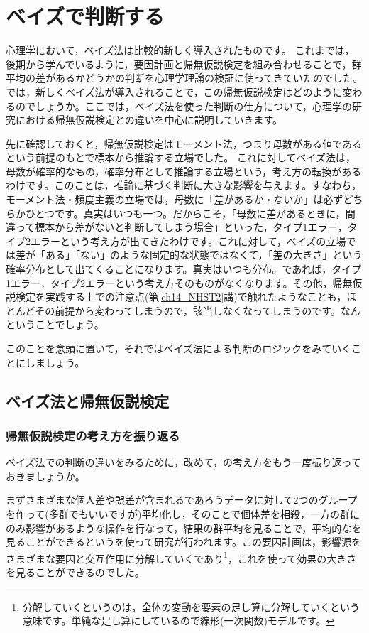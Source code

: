\documentclass{ltjbook}
\begin{document}
\VerbatimFootnotes

\chapter{ベイズで判断する}
\label{ch27_bayes_judgement}

心理学において，ベイズ法は比較的新しく導入されたものです。
これまでは，後期から学んでいるように，要因計画と帰無仮説検定を組み合わせることで，群平均の差があるかどうかの判断を心理学理論の検証に使ってきていたのでした。では，新しくベイズ法が導入されることで，この帰無仮説検定はどのように変わるのでしょうか。ここでは，ベイズ法を使った判断の仕方について，心理学の研究における帰無仮説検定との違いを中心に説明していきます。

先に確認しておくと，帰無仮説検定はモーメント法，つまり母数がある値であるという前提のもとで標本から推論する立場でした。
これに対してベイズ法は，母数が確率的なもの，確率分布として推論する立場という，考え方の転換があるわけです。このことは，推論に基づく判断に大きな影響を与えます。すなわち，モーメント法・頻度主義の立場では，母数に「差があるか・ないか」は必ずどちらかひとつです。真実はいつも一つ。だからこそ，「母数に差があるときに，間違って標本から差がないと判断してしまう場合」といった，タイプ1エラー，タイプ2エラーという考え方が出てきたわけです。これに対して，ベイズの立場では差が「ある」「ない」のような固定的な状態ではなくて，「差の大きさ」という確率分布として出てくることになります。真実はいつも分布。であれば，タイプ1エラー，タイプ2エラーという考え方そのものがなくなります。その他，帰無仮説検定を実践する上での注意点(第\ref{ch14_NHST2}講)で触れたようなことも，ほとんどその前提から変わってしまうので，該当しなくなってしまうのです。なんということでしょう。

このことを念頭に置いて，それではベイズ法による判断のロジックをみていくことにしましょう。

\section{ベイズ法と帰無仮説検定}

\subsection{帰無仮説検定の考え方を振り返る}
ベイズ法での判断の違いをみるために，改めて，の考え方をもう一度振り返っておきましょうか。

まずさまざまな個人差や誤差が含まれるであろうデータに対して2つのグループを作って(多群でもいいですが)平均化し，そのことで個体差を相殺，一方の群にのみ影響があるような操作を行なって，結果の群平均を見ることで，平均的なを見ることができるというを使って研究が行われます。この要因計画は，影響源をさまざまな要因と交互作用に分解していくであり\footnote{分解していくというのは，全体の変動を要素の足し算に分解していくという意味です。単純な足し算にしているので線形(一次関数)モデルです。}，これを使って効果の大きさを見ることができるのでした。
\end{document}
